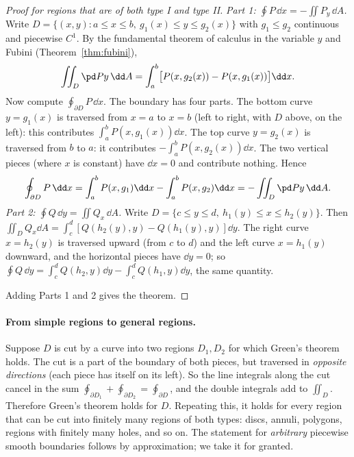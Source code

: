 \begin{proof}[Proof for regions that are of both type I and type II]
\emph{Part 1: $\oint P\,\dd x=-\iint P_y\,\dd A$.} Write $D=\{(x,y):a\le x\le b,\ g_1(x)\le y\le g_2(x)\}$ with $g_1\le g_2$ continuous and piecewise $C^1$. By the fundamental theorem of calculus in the variable $y$ and Fubini (Theorem~\ref{thm:fubini}),
\[
\iint_D\pd Py\,\dd A=\int_a^b\bigl[P(x,g_2(x))-P(x,g_1(x))\bigr]\dd x .
\]
Now compute $\oint_{\partial D}P\,\dd x$. The boundary has four parts. The bottom curve $y=g_1(x)$ is traversed from $x=a$ to $x=b$ (left to right, with $D$ above, on the left): this contributes $\int_a^bP(x,g_1(x))\dd x$. The top curve $y=g_2(x)$ is traversed from $b$ to $a$: it contributes $-\int_a^bP(x,g_2(x))\dd x$. The two vertical pieces (where $x$ is constant) have $\dd x=0$ and contribute nothing. Hence
\[
\oint_{\partial D}P\,\dd x=\int_a^bP(x,g_1)\dd x-\int_a^bP(x,g_2)\dd x=-\iint_D\pd Py\,\dd A .
\]
\emph{Part 2: $\oint Q\,\dd y=\iint Q_x\,\dd A$.} Write $D=\{c\le y\le d,\ h_1(y)\le x\le h_2(y)\}$. Then $\iint_DQ_x\dd A=\int_c^d[Q(h_2(y),y)-Q(h_1(y),y)]\dd y$. The right curve $x=h_2(y)$ is traversed upward (from $c$ to $d$) and the left curve $x=h_1(y)$ downward, and the horizontal pieces have $\dd y=0$; so $\oint Q\,\dd y=\int_c^dQ(h_2,y)\dd y-\int_c^dQ(h_1,y)\dd y$, the same quantity.

Adding Parts 1 and 2 gives the theorem.
\end{proof}

\paragraph{From simple regions to general regions.} Suppose $D$ is cut by a curve into two regions $D_1,D_2$ for which Green's theorem holds. The cut is a part of the boundary of both pieces, but traversed in \emph{opposite directions} (each piece has itself on its left). So the line integrals along the cut cancel in the sum $\oint_{\partial D_1}+\oint_{\partial D_2}=\oint_{\partial D}$, and the double integrals add to $\iint_D$. Therefore Green's theorem holds for $D$. Repeating this, it holds for every region that can be cut into finitely many regions of both types: discs, annuli, polygons, regions with finitely many holes, and so on. The statement for \emph{arbitrary} piecewise smooth boundaries follows by approximation; we take it for granted.


